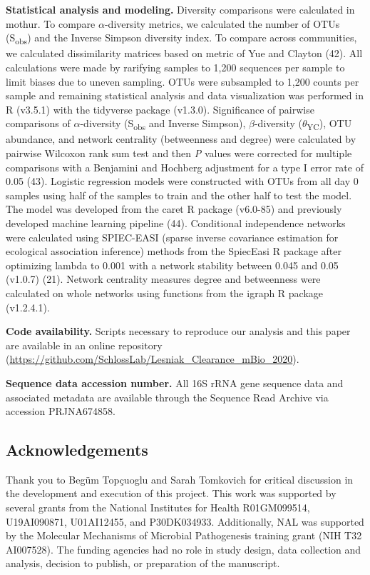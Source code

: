 \documentclass[11pt,]{article}
\begin{document}
\textbf{Statistical analysis and modeling.} Diversity comparisons were
calculated in mothur. To compare \(\alpha\)-diversity metrics, we
calculated the number of OTUs (S\textsubscript{obs}) and the Inverse
Simpson diversity index. To compare across communities, we calculated
dissimilarity matrices based on metric of Yue and Clayton (42). All
calculations were made by rarifying samples to 1,200 sequences per
sample to limit biases due to uneven sampling. OTUs were subsampled to
1,200 counts per sample and remaining statistical analysis and data
visualization was performed in R (v3.5.1) with the tidyverse package
(v1.3.0). Significance of pairwise comparisons of \(\alpha\)-diversity
(S\textsubscript{obs} and Inverse Simpson), \(\beta\)-diversity
(\(\theta\)\textsubscript{YC}), OTU abundance, and network centrality
(betweenness and degree) were calculated by pairwise Wilcoxon rank sum
test and then \emph{P} values were corrected for multiple comparisons
with a Benjamini and Hochberg adjustment for a type I error rate of 0.05
(43). Logistic regression models were constructed with OTUs from all day
0 samples using half of the samples to train and the other half to test
the model. The model was developed from the caret R package (v6.0-85)
and previously developed machine learning pipeline (44). Conditional
independence networks were calculated using SPIEC-EASI (sparse inverse
covariance estimation for ecological association inference) methods from
the SpiecEasi R package after optimizing lambda to 0.001 with a network
stability between 0.045 and 0.05 (v1.0.7) (21). Network centrality
measures degree and betweenness were calculated on whole networks using
functions from the igraph R package (v1.2.4.1).

\textbf{Code availability.} Scripts necessary to reproduce our analysis
and this paper are available in an online repository
(\url{https://github.com/SchlossLab/Lesniak_Clearance_mBio_2020}).

\textbf{Sequence data accession number.} All 16S rRNA gene sequence data
and associated metadata are available through the Sequence Read Archive
via accession PRJNA674858.

\hypertarget{acknowledgements}{%
\subsection{Acknowledgements}\label{acknowledgements}}

Thank you to Begüm Topçuoglu and Sarah Tomkovich for critical discussion
in the development and execution of this project. This work was
supported by several grants from the National Institutes for Health
R01GM099514, U19AI090871, U01AI12455, and P30DK034933. Additionally, NAL
was supported by the Molecular Mechanisms of Microbial Pathogenesis
training grant (NIH T32 AI007528). The funding agencies had no role in
study design, data collection and analysis, decision to publish, or
preparation of the manuscript.
\end{document}
